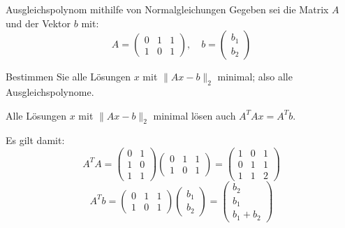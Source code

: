 \begin{example}{Ausgleichspolynom mithilfe von Normalgleichungen}
    Gegeben sei die Matrix $A$ und der Vektor $b$ mit:
    \[
        A =
        \begin{pmatrix}
            0 & 1 & 1 \\
            1 & 0 & 1
        \end{pmatrix}
        , \quad
        b =
        \begin{pmatrix}
            b_1 \\
            b_2
        \end{pmatrix}
    \]

    Bestimmen Sie alle Lösungen $x$ mit $\|Ax - b\|_2$ minimal; also alle Ausgleichspolynome.

    \exampleseparator

    Alle Lösungen $x$ mit $\|Ax - b\|_2$ minimal lösen auch $A^TAx = A^Tb$.

    Es gilt damit:
    \[
        A^TA =
        \begin{pmatrix}
            0 & 1 \\
            1 & 0 \\
            1 & 1
        \end{pmatrix}
        \begin{pmatrix}
            0 & 1 & 1 \\
            1 & 0 & 1
        \end{pmatrix}
        =
        \begin{pmatrix}
            1 & 0 & 1 \\
            0 & 1 & 1 \\
            1 & 1 & 2
        \end{pmatrix}
    \]
    \[
        A^Tb =
        \begin{pmatrix}
            0 & 1 & 1 \\
            1 & 0 & 1
        \end{pmatrix}
        \begin{pmatrix}
            b_1 \\
            b_2
        \end{pmatrix}
        =
        \begin{pmatrix}
            b_2 \\
            b_1 \\
            b_1 + b_2
        \end{pmatrix}
    \]


\end{example}
